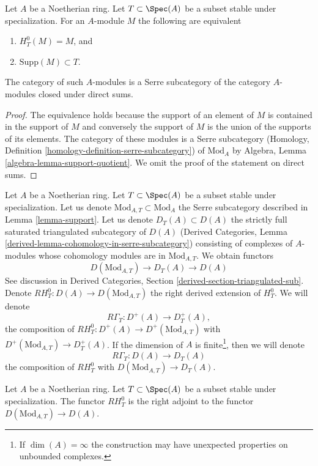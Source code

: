 \begin{lemma}
\label{lemma-support}
Let $A$ be a Noetherian ring. Let $T \subset \Spec(A)$ be a subset stable
under specialization. For an $A$-module $M$ the following are equivalent
\begin{enumerate}
\item $H^0_T(M) = M$, and
\item $\text{Supp}(M) \subset T$.
\end{enumerate}
The category of such $A$-modules is a Serre subcategory
of the category $A$-modules closed under direct sums.
\end{lemma}

\begin{proof}
The equivalence holds because the support of an element of $M$
is contained in the support of $M$ and conversely the support of
$M$ is the union of the supports of its elements.
The category of these modules is a Serre subcategory
(Homology, Definition \ref{homology-definition-serre-subcategory})
of $\text{Mod}_A$ by
Algebra, Lemma \ref{algebra-lemma-support-quotient}.
We omit the proof of the statement on direct sums.
\end{proof}

\noindent
Let $A$ be a Noetherian ring. Let $T \subset \Spec(A)$ be a subset stable
under specialization. Let us denote $\text{Mod}_{A, T} \subset \text{Mod}_A$
the Serre subcategory described in Lemma \ref{lemma-support}.
Let us denote $D_T(A) \subset D(A)$ the
strictly full saturated triangulated subcategory of $D(A)$
(Derived Categories, Lemma \ref{derived-lemma-cohomology-in-serre-subcategory})
consisting of complexes of $A$-modules whose cohomology modules
are in $\text{Mod}_{A, T}$. We obtain functors
$$
D(\text{Mod}_{A, T}) \to D_T(A) \to D(A)
$$
See discussion in
Derived Categories, Section \ref{derived-section-triangulated-sub}.
Denote $RH^0_T : D(A) \to D(\text{Mod}_{A, T})$ the right
derived extension of $H^0_T$. We will denote
$$
R\Gamma_T : D^+(A) \to D^+_T(A),
$$
the composition of $RH^0_T : D^+(A) \to D^+(\text{Mod}_{A, T})$ with
$D^+(\text{Mod}_{A, T}) \to D^+_T(A)$. If the dimension of $A$ is
finite\footnote{If $\dim(A) = \infty$ the construction
may have unexpected properties on unbounded complexes.},
then we will denote
$$
R\Gamma_T : D(A) \to D_T(A)
$$
the composition of $RH^0_T$ with
$D(\text{Mod}_{A, T}) \to D_T(A)$.

\begin{lemma}
\label{lemma-adjoint}
Let $A$ be a Noetherian ring. Let $T \subset \Spec(A)$
be a subset stable under specialization. The functor
$RH^0_T$ is the right adjoint to the functor
$D(\text{Mod}_{A, T}) \to D(A)$.
\end{lemma}

